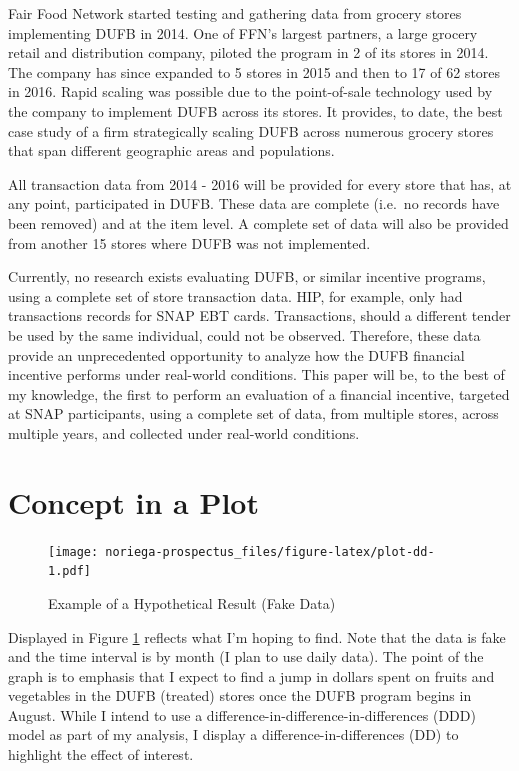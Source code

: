 \documentclass[12pt,letterpaperpaper,]{book}
\begin{document}
Fair Food Network started testing and gathering data from grocery stores
implementing DUFB in 2014. One of FFN's largest partners, a large
grocery retail and distribution company, piloted the program in 2 of its
stores in 2014. The company has since expanded to 5 stores in 2015 and
then to 17 of 62 stores in 2016. Rapid scaling was possible due to the
point-of-sale technology used by the company to implement DUFB across
its stores. It provides, to date, the best case study of a firm
strategically scaling DUFB across numerous grocery stores that span
different geographic areas and populations.

All transaction data from 2014 - 2016 will be provided for every store
that has, at any point, participated in DUFB. These data are complete
(i.e.~no records have been removed) and at the item level. A complete
set of data will also be provided from another 15 stores where DUFB was
not implemented.

Currently, no research exists evaluating DUFB, or similar incentive
programs, using a complete set of store transaction data. HIP, for
example, only had transactions records for SNAP EBT cards. Transactions,
should a different tender be used by the same individual, could not be
observed. Therefore, these data provide an unprecedented opportunity to
analyze how the DUFB financial incentive performs under real-world
conditions. This paper will be, to the best of my knowledge, the first
to perform an evaluation of a financial incentive, targeted at SNAP
participants, using a complete set of data, from multiple stores, across
multiple years, and collected under real-world conditions.

\newpage

\section*{Concept in a Plot}\label{concept-in-a-plot}

\begin{figure}
\centering
\texttt{[image: noriega-prospectus\_files/figure-latex/plot-dd-1.pdf]}
\caption{\label{fig:plot-dd}Example of a Hypothetical Result (Fake Data)}
\end{figure}

Displayed in Figure \ref{fig:plot-dd} reflects what I'm hoping to find.
Note that the data is fake and the time interval is by month (I plan to
use daily data). The point of the graph is to emphasis that I expect to
find a jump in dollars spent on fruits and vegetables in the DUFB
(treated) stores once the DUFB program begins in August. While I intend
to use a difference-in-difference-in-differences (DDD) model as part of
my analysis, I display a difference-in-differences (DD) to highlight the
effect of interest.
\end{document}
